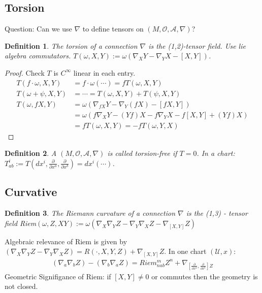 \documentclass[10pt, oneside]{article}
\newtheorem{defn}{Definition}
\begin{document}
   \subsection{Torsion}
   Question: Can we use $\nabla$ to define tensors on $(M,\mathcal{O},\mathcal{A},\nabla)$?
   \begin{defn}
   The torsion of a connection $\nabla$ is the (1,2)-tensor field. Use lie algebra commutators. $T(\omega,X,Y):= \omega(\nabla_X Y - \nabla_Y X - [X,Y])$.
   \end{defn}   
   \begin{proof}
      Check $T$ is $C^\infty$ linear in each entry. 
      \begin{align*}
         T(f \cdot \omega,X,Y)&= f \cdot \omega (\cdots)= f T(\omega,X,Y) \\
         T(\omega+\psi, X,Y) &= \cdots = T(\omega,X,Y)+T(\psi,X,Y) \\
         T(\omega,f X,Y) &= \omega(\nabla_{fX} Y - \nabla_Y (f X) - [fX,Y]) \\
         &= \omega(f \nabla_X Y - (Y f) X - f \nabla_Y X - f[X,Y] + (Y f) X) \\
         &= f T(\omega,X,Y) = - f T(\omega,Y,X)
      \end{align*}
   \end{proof}
   \begin{defn}
   A $(M,\mathcal{O},\mathcal{A},\nabla)$ is called torsion-free if $T=0$. In a chart: $T^i_{ab} := T(dx^i,\frac{\partial}{\partial x^a},\frac{\partial}{\partial x^b}) = dx^i (\cdots)$.
   \end{defn}
   \subsection{Curvative}
   \begin{defn}
   The Riemann curvature of a connection $\nabla$ is the (1,3) - tensor field Riem$(\omega,Z,XY):= \omega(\nabla_X \nabla_Y Z - \nabla_Y \nabla_X Z - \nabla_{[X,Y]}Z)$
   \end{defn}
   Algebraic relevance of Riem is given by $(\nabla_X \nabla_Y Z - \nabla_Y \nabla_X Z) = R(\cdot,X,Y,Z)+\nabla_{[X,Y]} Z$. In one chart $(\mathcal{U},x)$:
   \begin{align*}
      (\nabla_a \nabla_b Z) - (\nabla_b \nabla_a Z) = Riem^m_{n ab} Z^n + \nabla_{[\frac{\partial}{\partial x^a},\frac{\partial}{\partial x^b}]Z}
   \end{align*}
   Geometric Signifigance of Riem: if $[X,Y] \not = 0$ or commutes then the geometry is not closed. 
\end{document}
